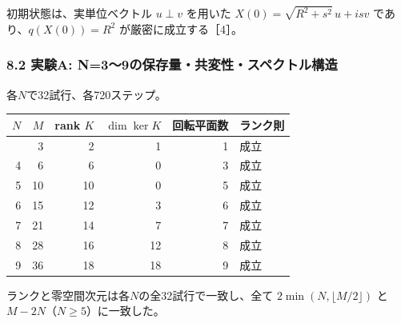 \documentclass[
  a4paper,
]{ltjsarticle}
\newcounter{none} %
\begin{document}
初期状態は、実単位ベクトル \(u\perp v\) を用いた
\(X(0)=\sqrt{R^2+s^2}\,u+isv\) であり、\(q(X(0))=R^2\)
が厳密に成立する［4］。

\subsubsection{8.2 実験A:
N=3〜9の保存量・共変性・スペクトル構造}\label{ux5b9fux9a13a-n39ux306eux4fddux5b58ux91cfux5171ux5909ux6027ux30b9ux30daux30afux30c8ux30ebux69cbux9020}

各\(N\)で32試行、各720ステップ。

{\def\LTcaptype{none} %
\begin{longtable}[]{@{}rrrrrl@{}}
\toprule\noalign{}
\(N\) & \(M\) & rank \(K\) & \(\dim\ker K\) & 回転平面数 & ランク則 \\
\midrule\noalign{}
\endhead
\bottomrule\noalign{}
\endlastfoot
3 & 3 & 2 & 1 & 1 & 成立 \\
4 & 6 & 6 & 0 & 3 & 成立 \\
5 & 10 & 10 & 0 & 5 & 成立 \\
6 & 15 & 12 & 3 & 6 & 成立 \\
7 & 21 & 14 & 7 & 7 & 成立 \\
8 & 28 & 16 & 12 & 8 & 成立 \\
9 & 36 & 18 & 18 & 9 & 成立 \\
\end{longtable}
}

ランクと零空間次元は各\(N\)の全32試行で一致し、全て
\(2\min(N,\lfloor M/2\rfloor)\) と \(M-2N\)（\(N\ge5\)）に一致した。
\end{document}
